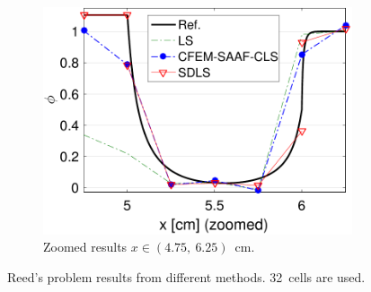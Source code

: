 \documentclass[review]{elsarticle}
\begin{document}
\begin{figure}[ht!]
\begin{subfigure}{.5\textwidth}
\begin{center}
			\includegraphics[width=1.3\textwidth]{cdls-reed-zoomed}
			\caption[]{Zoomed results $x\in(4.75,~6.25)$\ cm.}%
			\label{f:reed-real-zoomed}
		\end{center}
	\end{subfigure}
	\caption{Reed's problem results from different methods. 32\ cells are used.}
\end{figure}
\end{document}
